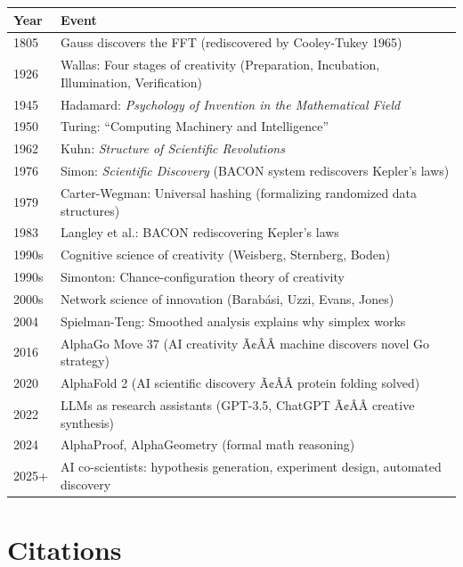 \begin{tabularx}{\linewidth}{|l|X|}
\hline
\textbf{Year} & \textbf{Event} \\ \hline
1805 & Gauss discovers the FFT (rediscovered by Cooley-Tukey 1965) \\
\hline
1926 & Wallas: Four stages of creativity (Preparation, Incubation, Illumination, Verification) \\
\hline
1945 & Hadamard: \emph{Psychology of Invention in the Mathematical Field} \\
\hline
1950 & Turing: ``Computing Machinery and Intelligence'' \\
\hline
1962 & Kuhn: \emph{Structure of Scientific Revolutions} \\
\hline
1976 & Simon: \emph{Scientific Discovery} (BACON system rediscovers Kepler's laws) \\
\hline
1979 & Carter-Wegman: Universal hashing (formalizing randomized data structures) \\
\hline
1983 & Langley et al.: BACON rediscovering Kepler's laws \\
\hline
1990s & Cognitive science of creativity (Weisberg, Sternberg, Boden) \\
\hline
1990s & Simonton: Chance-configuration theory of creativity \\
\hline
2000s & Network science of innovation (Barab\'asi, Uzzi, Evans, Jones) \\
\hline
2004 & Spielman-Teng: Smoothed analysis explains why simplex works \\
\hline
2016 & AlphaGo Move 37 (AI creativity Ã¢ÂÂ machine discovers novel Go strategy) \\
\hline
2020 & AlphaFold 2 (AI scientific discovery Ã¢ÂÂ protein folding solved) \\
\hline
2022 & LLMs as research assistants (GPT-3.5, ChatGPT Ã¢ÂÂ creative synthesis) \\
\hline
2024 & AlphaProof, AlphaGeometry (formal math reasoning) \\
\hline
2025+ & AI co-scientists: hypothesis generation, experiment design, automated discovery \\
\hline
\end{tabularx}

\section{Citations}
\label{sec:anatomy:citations}

